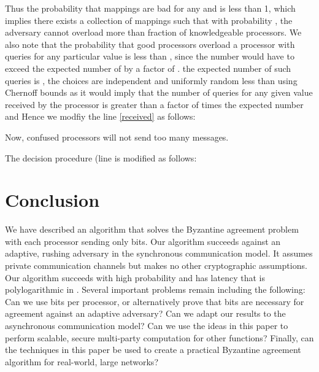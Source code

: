 \documentclass[letterpaper,11pt]{article}
\begin{document}
{Thus the probability that  mappings are bad for any  and  is less than 1, which implies there exists
a collection of   mappings such that with probability , the adversary cannot overload more than  fraction of knowledgeable processors.  We also note that the probability that good processors overload a processor with queries for any particular value
  is less than , since the number would have to exceed the expected number of  by
a factor of . the expected number of such queries is , the choices are independent and uniformly random less than 
 using Chernoff bounds as it would imply that the number of queries for any given value received by the processor is
greater than a factor of  times the expected number and
Hence we  modfiy the line \ref{received} as follows:

Now, confused processors will not send too many messages. 

The decision procedure (line \label{majority} is modified as follows:
}


\section{Conclusion}
We have described an algorithm that solves the Byzantine agreement problem with each processor sending only  bits.  Our algorithm succeeds against an adaptive, rushing adversary in the synchronous communication model.  It assumes private communication channels but makes no other cryptographic assumptions.  Our algorithm succeeds with high probability and has latency that is polylogarithmic in .  Several important problems remain including the following:  Can we use  bits per processor, or alternatively prove that  bits are necessary for agreement against an adaptive adversary?  Can we adapt our results to the asynchronous communication model?  Can we use the ideas in this paper to perform scalable, secure multi-party computation for other functions?  Finally, can the techniques in this paper be used to create a practical Byzantine agreement algorithm for real-world, large networks?

\pagebreak
\end{document}
